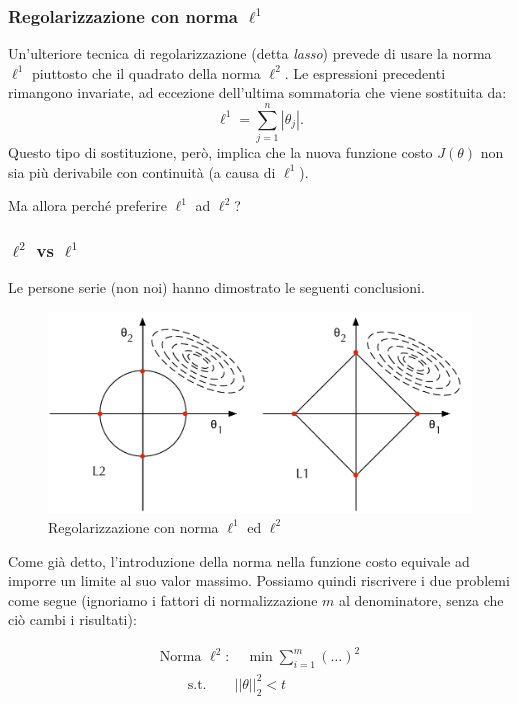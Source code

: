 \subsubsection{Regolarizzazione con norma $\ell^1$}
Un'ulteriore tecnica di regolarizzazione (detta \emph{lasso}) prevede di usare la norma $\ell^1$ piuttosto che il quadrato della norma $\ell^2$. 
Le espressioni precedenti rimangono invariate, ad eccezione dell'ultima sommatoria che viene sostituita da:
\begin{equation*}
\ell^1 = \sum_{j=1}^n|\theta_j|.
\end{equation*}
Questo tipo di sostituzione, però, implica che la nuova funzione costo $J(\theta)$ non sia più derivabile con continuità (a causa di $\ell^1$). 

Ma allora perché preferire $\ell^1$ ad $\ell^2$?

\subsubsection{$\ell^2$ vs $\ell^1$}
Le persone serie (non noi) hanno dimostrato le seguenti conclusioni.

\begin{figure}[]
\centering
  \includegraphics[width=\columnwidth]{images/norme}
  \caption{Regolarizzazione con norma $\ell^1$ ed $\ell^2$}
  \label{fig:norme}
\end{figure}

Come già detto, l'introduzione della norma nella funzione costo equivale ad imporre un limite al suo valor massimo. Possiamo quindi riscrivere i due problemi come segue (ignoriamo i fattori di normalizzazione $m$ al denominatore, senza che ciò cambi i risultati):

\begin{gather}
\text{Norma }\ell^2:
\quad \min\sum_{i=1}^m(\dots)^2 \\
\qquad \text{s.t.} \qquad ||\theta||_2^2 < t
\end{gather}
 
